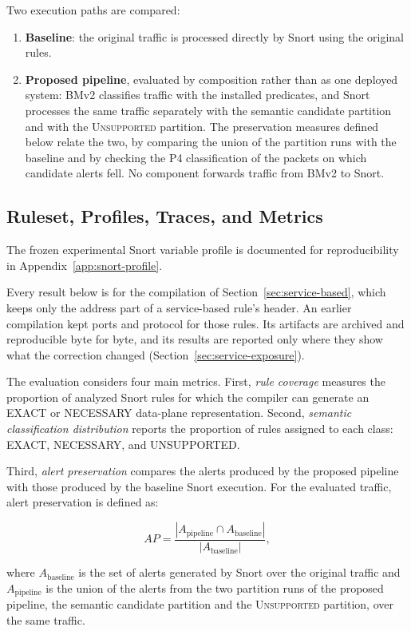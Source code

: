 \documentclass{article}
\begin{document}
Two execution paths are compared:

\begin{enumerate}
    \item \textbf{Baseline}: the original traffic is processed directly
    by Snort using the original rules.

    \item \textbf{Proposed pipeline}, evaluated by composition rather than
    as one deployed system: BMv2 classifies traffic with the installed
    predicates, and Snort processes the same traffic separately with the
    semantic candidate partition and with the \textsc{Unsupported}
    partition. The preservation measures defined below relate the two, by
    comparing the union of the partition runs with the baseline and by
    checking the P4 classification of the packets on which candidate
    alerts fell. No
    component forwards traffic from BMv2 to Snort.
\end{enumerate}
\subsection{Ruleset, Profiles, Traces, and Metrics}
The frozen experimental Snort variable profile is documented for
reproducibility in Appendix~\ref{app:snort-profile}.

Every result below is for the compilation of
Section~\ref{sec:service-based}, which keeps only the address part of a
service-based rule's header. An earlier compilation kept ports and protocol
for those rules. Its artifacts are archived and reproducible byte for byte,
and its results are reported only where they show what the correction
changed (Section~\ref{sec:service-exposure}).

The evaluation considers four main metrics. First, \textit{rule
coverage} measures the proportion of analyzed Snort rules for which the
compiler can generate an EXACT or NECESSARY data-plane representation.
Second, \textit{semantic classification distribution} reports the
proportion of rules assigned to each class: EXACT, NECESSARY, and
UNSUPPORTED.

Third, \textit{alert preservation} compares the alerts produced by the
proposed pipeline with those produced by the baseline Snort execution.
For the evaluated traffic, alert preservation is defined as:

\[
AP = \frac{|A_{\mathrm{pipeline}} \cap A_{\mathrm{baseline}}|}
{|A_{\mathrm{baseline}}|},
\]

where $A_{\mathrm{baseline}}$ is the set of alerts generated by Snort
over the original traffic and $A_{\mathrm{pipeline}}$ is the union of the
alerts from the two partition runs of the proposed pipeline, the semantic
candidate partition and the \textsc{Unsupported} partition, over the same
traffic.
\end{document}
